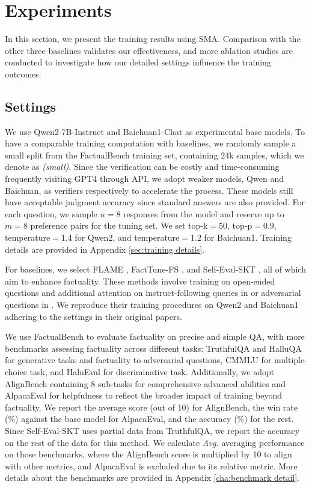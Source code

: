 \section{Experiments}
In this section, we present the training results using SMA. Comparison with the other three baselines validates our effectiveness, and more ablation studies are conducted to investigate how our detailed settings influence the training outcomes.

\subsection{Settings}
We use Qwen2-7B-Instruct \citep{qwen2} and Baichuan1-Chat as experimental base models. To have a comparable training computation with baselines, we randomly sample a small split from the FactualBench training set, containing 24k samples, which we denote as \textit{(small)}. Since the verification can be costly and time-consuming frequently visiting GPT4 through API, we adopt weaker models, Qwen and Baichuan, as verifiers respectively to accelerate the process. These models still have acceptable judgment accuracy since standard answers are also provided. For each question, we sample $n=8$ responses from the model and reserve up to $m=8$ preference pairs for the tuning set. We set top-k$=$50, top-p$=$0.9, temperature$=$1.4 for Qwen2, and temperature$=$1.2 for Baichuan1. Training details are provided in Appendix \ref{sec:training details}.

For baselines, we select FLAME \citep{flame}, FactTune-FS \citep{facttune}, and Self-Eval-SKT \citep{self-eval-skt}, all of which aim to enhance factuality. These methods involve training on open-ended questions and additional attention on instruct-following queries \citep{kopf2023openassistant} in \citet{flame} or adversarial questions \citep{lin2022truthfulqa} in \citet{self-eval-skt}. We reproduce their training procedures on Qwen2 and Baichuan1 adhering to the settings in their original papers.

We use FactualBench to evaluate factuality on precise and simple QA, with more benchmarks assessing factuality across different tasks: TruthfulQA \citep{lin2022truthfulqa} and HalluQA \citep{cheng2023evaluating} for generative tasks and factuality to adversarial questions, CMMLU \citep{li2023cmmlu} for multiple-choice task, and HaluEval \citep{li2023halueval} for discriminative task. Additionally, we adopt AlignBench \citep{liu2023alignbench} containing 8 sub-tasks for comprehensive advanced abilities and AlpacaEval \citep{alpaca_eval} for helpfulness to reflect the broader impact of training beyond factuality. We report the average score (out of 10) for AlignBench, the win rate (\%) against the base model for AlpacaEval, and the accuracy (\%) for the rest. Since Self-Eval-SKT uses partial data from TruthfulQA, we report the accuracy on the rest of the data for this method. We calculate \textit{Avg.} averaging performance on those benchmarks, where the AlignBench score is multiplied by 10 to align with other metrics, and AlpacaEval is excluded due to its relative metric. More details about the benchmarks are provided in Appendix \ref{cha:benchmark detail}.

